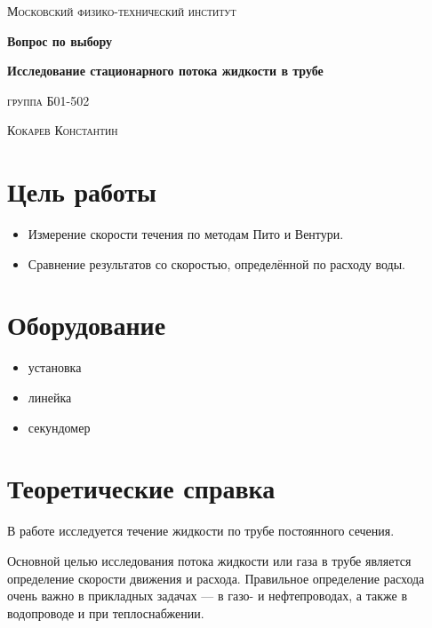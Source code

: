 \documentclass[12pt]{article}
\begin{document}
\begin{titlepage}
	\centering
	{\scshape\LARGE Московский физико-технический институт \par}
	\vspace{3cm}
	{\huge\bfseries Вопрос по выбору \par}
	\vspace{1cm}
	{\huge\bfseries Исследование стационарного потока жидкости в трубе \par}
	\vspace{1cm}
	\vfill
    
\begin{flushright}
	{\scshape\LARGE группа Б01-502}\par
	\vspace{0.3cm}
	{\scshape\LARGE Кокарев Константин} %
\end{flushright}
	\vfill

\end{titlepage}

\section*{Цель работы}

\begin{itemize}
  \item Измерение скорости течения по методам Пито и Вентури.
  \item Сравнение результатов со скоростью, определённой по расходу воды.
\end{itemize}

\section*{Оборудование}

\begin{itemize}
  \item установка
  \item линейка
  \item секундомер
\end{itemize}

\section*{Теоретические справка}

В работе исследуется течение жидкости по трубе постоянного сечения.

Основной целью исследования потока жидкости или газа в трубе является определение скорости движения и расхода. Правильное определение расхода очень важно в прикладных задачах — в газо- и нефтепроводах, а также в водопроводе и при теплоснабжении.
\end{document}
